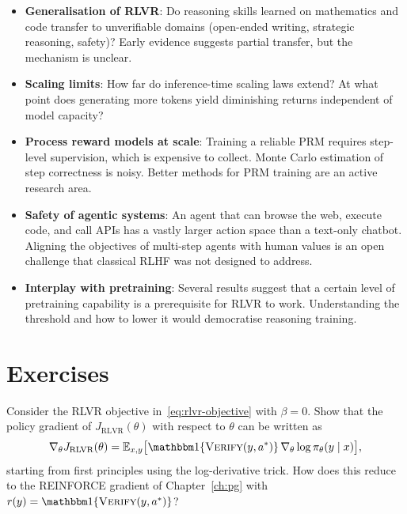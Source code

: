 \begin{itemize}[leftmargin=*]
\item \textbf{Generalisation of RLVR}: Do reasoning skills learned
  on mathematics and code transfer to unverifiable domains
  (open-ended writing, strategic reasoning, safety)? Early evidence
  suggests partial transfer, but the mechanism is unclear.

\item \textbf{Scaling limits}: How far do inference-time scaling laws
  extend? At what point does generating more tokens yield diminishing
  returns independent of model capacity?

\item \textbf{Process reward models at scale}: Training a reliable
  PRM requires step-level supervision, which is expensive to collect.
  Monte Carlo estimation of step correctness is noisy. Better methods
  for PRM training are an active research area.

\item \textbf{Safety of agentic systems}: An agent that can browse
  the web, execute code, and call APIs has a vastly larger action
  space than a text-only chatbot. Aligning the objectives of
  multi-step agents with human values is an open challenge that
  classical RLHF was not designed to address.

\item \textbf{Interplay with pretraining}: Several results suggest
  that a certain level of pretraining capability is a prerequisite
  for RLVR to work. Understanding the threshold and how to lower it
  would democratise reasoning training.
\end{itemize}

\section*{Exercises}

\begin{exercise}
\label{ex:rlvr-gradient}
Consider the RLVR objective in~\eqref{eq:rlvr-objective} with $\beta = 0$.
Show that the policy gradient of $J_{\mathrm{RLVR}}(\theta)$ with
respect to $\theta$ can be written as
\[
\nabla_\theta J_{\mathrm{RLVR}}(\theta)
  = \E_{x, y}\bigl[\ind\{\textsc{Verify}(y, a^*)\}\,
    \nabla_\theta \log \pi_\theta(y \mid x)\bigr],
\]
starting from first principles using the log-derivative trick. How
does this reduce to the REINFORCE gradient of
Chapter~\ref{ch:pg} with $r(y) = \ind\{\textsc{Verify}(y,a^*)\}$?
\end{exercise}

